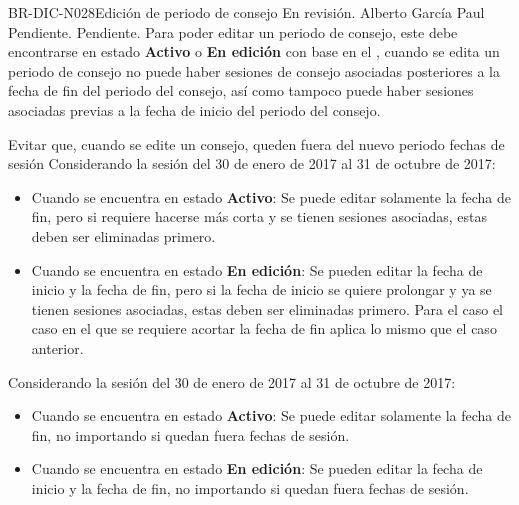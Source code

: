 \begin{BusinessRule}{BR-DIC-N028}{Edición de periodo de consejo}
	{\bcCondition} %
	{\btExecutive}     %
	{\blInfluencing}     %
	\BRItem[Estado] En revisión.
	 Alberto García Paul	
	 Pendiente.
	 Pendiente.
	\BRItem[Descripción] Para poder editar un periodo de consejo, este debe encontrarse en estado \textbf{Activo} o \textbf{En edición} con base en el , cuando se edita un periodo de consejo no puede haber sesiones de consejo asociadas posteriores a la fecha de fin del periodo del consejo, así como tampoco puede haber sesiones asociadas previas a la fecha de inicio del periodo del consejo. 
	\BRItem[Sentencia] \cdtEmpty
	
%
	\BRItem[Motivación] Evitar que, cuando se edite un consejo, queden fuera del nuevo periodo fechas de sesión
	 Considerando la sesión del 30 de enero de 2017 al 31 de octubre de 2017:
	\begin{itemize}
		\item Cuando se encuentra en estado \textbf{Activo}: Se puede editar solamente la fecha de fin, pero si requiere hacerse más corta y se tienen sesiones asociadas, estas deben ser eliminadas primero.
		\item Cuando se encuentra en estado \textbf{En edición}: Se pueden editar la fecha de inicio y la fecha de fin, pero si la fecha de inicio se quiere prolongar y ya se tienen sesiones asociadas, estas deben ser eliminadas primero. Para el caso el caso en el que se requiere acortar la fecha de fin aplica lo mismo que el caso anterior.
	\end{itemize} 
	
	 Considerando la sesión del 30 de enero de 2017 al 31 de octubre de 2017:
	\begin{itemize}
		\item Cuando se encuentra en estado \textbf{Activo}: Se puede editar solamente la fecha de fin, no importando si quedan fuera fechas de sesión.
		\item Cuando se encuentra en estado \textbf{En edición}: Se pueden editar la fecha de inicio y la fecha de fin, no importando si quedan fuera fechas de sesión.
	\end{itemize} 
	
\end{BusinessRule}

